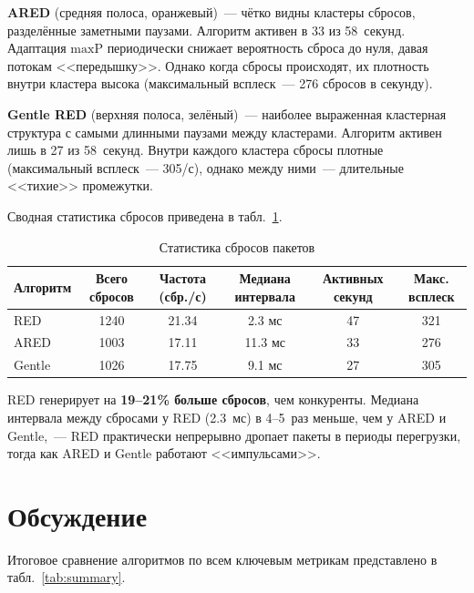 \documentclass[12pt,a4paper]{article}
\begin{document}
\textbf{ARED} (средняя полоса, оранжевый)~--- чётко видны кластеры сбросов, разделённые заметными паузами. Алгоритм активен в 33 из 58~секунд. Адаптация $\mathrm{maxP}$ периодически снижает вероятность сброса до нуля, давая потокам <<передышку>>. Однако когда сбросы происходят, их плотность внутри кластера высока (максимальный всплеск~--- 276 сбросов в секунду).

\textbf{Gentle RED} (верхняя полоса, зелёный)~--- наиболее выраженная кластерная структура с самыми длинными паузами между кластерами. Алгоритм активен лишь в 27 из 58~секунд. Внутри каждого кластера сбросы плотные (максимальный всплеск~--- 305/с), однако между ними~--- длительные <<тихие>> промежутки.

Сводная статистика сбросов приведена в табл.~\ref{tab:drops}.

\begin{table}[H]
\centering
\caption{Статистика сбросов пакетов}
\label{tab:drops}
\begin{tabular}{lccccc}
\toprule
Алгоритм & Всего сбросов & Частота (сбр./с) & Медиана интервала & Активных секунд & Макс. всплеск \\
\midrule
RED      & 1240 & 21.34 & 2.3 мс  & 47 & 321 \\
ARED     & 1003 & 17.11 & 11.3 мс & 33 & 276 \\
Gentle   & 1026 & 17.75 & 9.1 мс  & 27 & 305 \\
\bottomrule
\end{tabular}
\end{table}

RED генерирует на \textbf{19--21\% больше сбросов}, чем конкуренты. Медиана интервала между сбросами у RED (2.3~мс) в 4--5~раз меньше, чем у ARED и Gentle,~--- RED практически непрерывно дропает пакеты в периоды перегрузки, тогда как ARED и Gentle работают <<импульсами>>.

\section{Обсуждение}
\label{sec:discussion}

Итоговое сравнение алгоритмов по всем ключевым метрикам представлено в табл.~\ref{tab:summary}.
\end{document}
